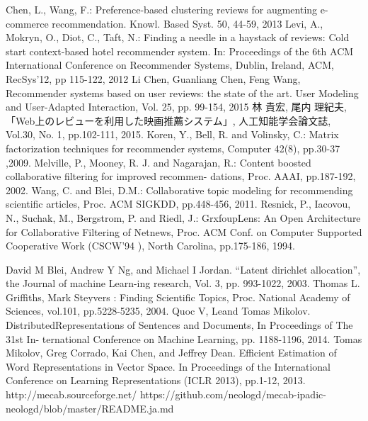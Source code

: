 \documentclass[a4paper,11pt,oneside,openany]{jsbook}
\begin{document}
\begin{thebibliography}{99}
	Chen, L., Wang, F.: Preference-based clustering reviews for augmenting e-commerce recommendation. Knowl. Based Syst. 50, 44-59, 2013
	Levi, A., Mokryn, O., Diot, C., Taft, N.: Finding a needle in a haystack of reviews: Cold start context-based hotel recommender system. In: Proceedings of the 6th ACM International Conference on Recommender Systems, Dublin, Ireland, ACM, RecSys’12, pp 115-122, 2012
	Li Chen, Guanliang Chen, Feng Wang, Recommender systems based on user reviews: the state of the art. User Modeling and User-Adapted Interaction, Vol. 25, pp. 99-154, 2015
	林 貴宏, 尾内 理紀夫, 「Web上のレビューを利用した映画推薦システム」, 人工知能学会論文誌, Vol.30, No. 1, pp.102-111, 2015.
	Koren, Y., Bell, R. and Volinsky, C.: Matrix factorization techniques for recommender systems, Computer 42(8), pp.30-37 ,2009.
	Melville, P., Mooney, R. J. and Nagarajan, R.: Content boosted collaborative filtering for improved recommen- dations, Proc. AAAI, pp.187-192, 2002.
	Wang, C. and Blei, D.M.: Collaborative topic modeling for recommending scientific articles, Proc. ACM SIGKDD, pp.448-456, 2011.
	Resnick, P., Iacovou, N., Suchak, M., Bergstrom, P. and Riedl, J.: GrxfoupLens: An Open Architecture for Collaborative Filtering of Netnews, Proc. ACM Conf. on Computer Supported Cooperative Work (CSCW’94 ), North Carolina, pp.175-186, 1994.
	
	David M Blei, Andrew Y Ng, and Michael I Jordan. “Latent dirichlet allocation”, the Journal of machine Learn-ing research, Vol. 3, pp. 993-1022, 2003.
	Thomas L. Griffiths, Mark Steyvers : Finding Scientific Topics, Proc. National Academy of Sciences, vol.101, pp.5228-5235, 2004.	
	Quoc V, Leand Tomas Mikolov. DistributedRepresentations of Sentences and Documents, In Proceedings of The 31st In- ternational Conference on Machine Learning, pp. 1188-1196, 2014.	
	Tomas Mikolov, Greg Corrado, Kai Chen, and Jeffrey Dean. Efficient Estimation of Word Representations in Vector Space. In Proceedings of the International Conference on Learning Representations (ICLR 2013), pp.1-12, 2013.
	http://mecab.sourceforge.net/
	https://github.com/neologd/mecab-ipadic-neologd/blob/master/README.ja.md
	
	
\end{thebibliography}
\end{document}

